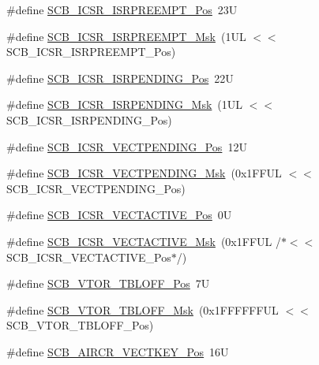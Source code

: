 \begin{DoxyCompactItemize}
\item 
\#define \hyperlink{group___c_m_s_i_s___s_c_b_ga11cb5b1f9ce167b81f31787a77e575df}{S\+C\+B\+\_\+\+I\+C\+S\+R\+\_\+\+I\+S\+R\+P\+R\+E\+E\+M\+P\+T\+\_\+\+Pos}~23U
\item 
\#define \hyperlink{group___c_m_s_i_s___s_c_b_gaa966600396290808d596fe96e92ca2b5}{S\+C\+B\+\_\+\+I\+C\+S\+R\+\_\+\+I\+S\+R\+P\+R\+E\+E\+M\+P\+T\+\_\+\+Msk}~(1\+U\+L $<$$<$ S\+C\+B\+\_\+\+I\+C\+S\+R\+\_\+\+I\+S\+R\+P\+R\+E\+E\+M\+P\+T\+\_\+\+Pos)
\item 
\#define \hyperlink{group___c_m_s_i_s___s_c_b_ga10749d92b9b744094b845c2eb46d4319}{S\+C\+B\+\_\+\+I\+C\+S\+R\+\_\+\+I\+S\+R\+P\+E\+N\+D\+I\+N\+G\+\_\+\+Pos}~22U
\item 
\#define \hyperlink{group___c_m_s_i_s___s_c_b_ga056d74fd538e5d36d3be1f28d399c877}{S\+C\+B\+\_\+\+I\+C\+S\+R\+\_\+\+I\+S\+R\+P\+E\+N\+D\+I\+N\+G\+\_\+\+Msk}~(1\+U\+L $<$$<$ S\+C\+B\+\_\+\+I\+C\+S\+R\+\_\+\+I\+S\+R\+P\+E\+N\+D\+I\+N\+G\+\_\+\+Pos)
\item 
\#define \hyperlink{group___c_m_s_i_s___s_c_b_gada60c92bf88d6fd21a8f49efa4a127b8}{S\+C\+B\+\_\+\+I\+C\+S\+R\+\_\+\+V\+E\+C\+T\+P\+E\+N\+D\+I\+N\+G\+\_\+\+Pos}~12U
\item 
\#define \hyperlink{group___c_m_s_i_s___s_c_b_gacb6992e7c7ddc27a370f62878a21ef72}{S\+C\+B\+\_\+\+I\+C\+S\+R\+\_\+\+V\+E\+C\+T\+P\+E\+N\+D\+I\+N\+G\+\_\+\+Msk}~(0x1\+F\+F\+U\+L $<$$<$ S\+C\+B\+\_\+\+I\+C\+S\+R\+\_\+\+V\+E\+C\+T\+P\+E\+N\+D\+I\+N\+G\+\_\+\+Pos)
\item 
\#define \hyperlink{group___c_m_s_i_s___s_c_b_gae4f602c7c5c895d5fb687b71b0979fc3}{S\+C\+B\+\_\+\+I\+C\+S\+R\+\_\+\+V\+E\+C\+T\+A\+C\+T\+I\+V\+E\+\_\+\+Pos}~0U
\item 
\#define \hyperlink{group___c_m_s_i_s___s_c_b_ga5533791a4ecf1b9301c883047b3e8396}{S\+C\+B\+\_\+\+I\+C\+S\+R\+\_\+\+V\+E\+C\+T\+A\+C\+T\+I\+V\+E\+\_\+\+Msk}~(0x1\+F\+F\+U\+L /$\ast$$<$$<$ S\+C\+B\+\_\+\+I\+C\+S\+R\+\_\+\+V\+E\+C\+T\+A\+C\+T\+I\+V\+E\+\_\+\+Pos$\ast$/)
\item 
\#define \hyperlink{group___c_m_s_i_s___s_c_b_gac6a55451ddd38bffcff5a211d29cea78}{S\+C\+B\+\_\+\+V\+T\+O\+R\+\_\+\+T\+B\+L\+O\+F\+F\+\_\+\+Pos}~7U
\item 
\#define \hyperlink{group___c_m_s_i_s___s_c_b_ga75e395ed74042923e8c93edf50f0996c}{S\+C\+B\+\_\+\+V\+T\+O\+R\+\_\+\+T\+B\+L\+O\+F\+F\+\_\+\+Msk}~(0x1\+F\+F\+F\+F\+F\+F\+U\+L $<$$<$ S\+C\+B\+\_\+\+V\+T\+O\+R\+\_\+\+T\+B\+L\+O\+F\+F\+\_\+\+Pos)
\item 
\#define \hyperlink{group___c_m_s_i_s___s_c_b_gaaa27c0ba600bf82c3da08c748845b640}{S\+C\+B\+\_\+\+A\+I\+R\+C\+R\+\_\+\+V\+E\+C\+T\+K\+E\+Y\+\_\+\+Pos}~16U

\end{DoxyCompactItemize}
